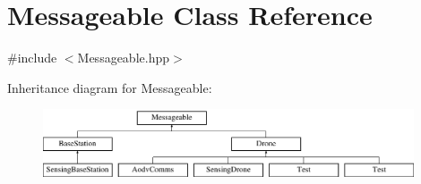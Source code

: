 \hypertarget{class_messageable}{}\section{Messageable Class Reference}
\label{class_messageable}


{\ttfamily \#include $<$Messageable.\+hpp$>$}

Inheritance diagram for Messageable\+:\begin{figure}[H]
\begin{center}
\leavevmode
\includegraphics[height=2.000000cm]{class_messageable}
\end{center}
\end{figure}
